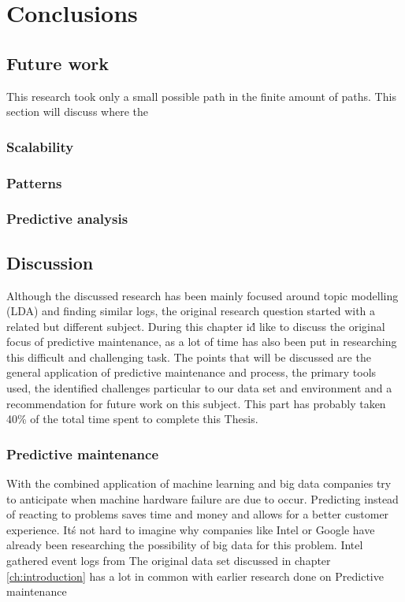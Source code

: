 \chapter{Conclusions} \label{ch:conclusions}

\section {Future work}
This research took only a small possible path in the finite amount of paths. This section will discuss where the 
\subsection{Scalability}
\subsection{Patterns}
\subsection{Predictive analysis}

\section{Discussion}
Although the discussed research has been mainly focused around topic modelling (LDA) and finding similar logs, the original research question started with a related but different subject. During this chapter i\'d like to discuss the original focus of predictive maintenance, as a lot of time has also been put in researching this difficult and challenging task. The points that will be discussed are the general application of predictive maintenance and process, the primary tools used, the identified challenges particular to our data set and environment and a recommendation for future work on this subject. This part has probably taken 40\% of the total time spent to complete this Thesis.

\subsection{Predictive maintenance}
With the combined application of machine learning and big data companies try to anticipate when machine hardware failure are due to occur. Predicting instead of reacting to problems saves time and money and allows for a better customer experience. It\'s not hard to imagine why companies like Intel \cite{AjayChandramoulyRavindraNarkhedeVijayMungaraGuillermoRueda2013ReducingAnalytics} or Google have already been researching the possibility of big data for this problem. Intel gathered event logs from 
The original data set discussed in chapter \ref{ch:introduction} has a lot in common with earlier research done on Predictive maintenance \cite{Sipos2014Log-basedMaintenance}

